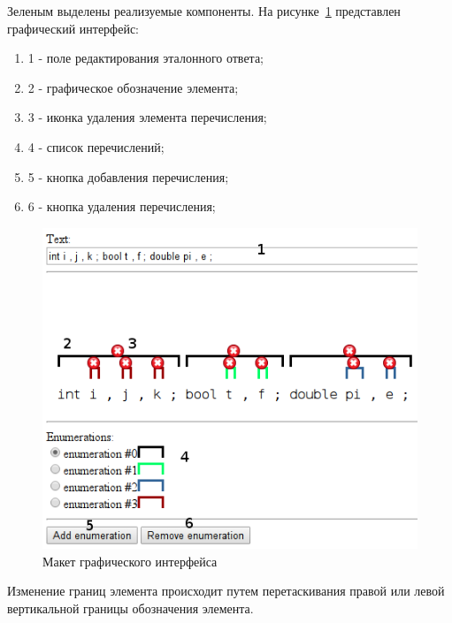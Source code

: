 \documentclass[a4paper,english]{G2-105}
\begin{document}
\par Зеленым выделены реализуемые компоненты.
На рисунке~\ref{gui} представлен графический интерфейс:
\begin{enumerate}
    \item 1 - поле редактирования эталонного ответа; 
    \item 2 - графическое обозначение элемента;
    \item 3 - иконка удаления элемента перечисления;
    \item 4 - список перечислений;
    \item 5 - кнопка добавления перечисления;
    \item 6 - кнопка удаления перечисления;
\end{enumerate}
\begin{figure} 
\includegraphics[width = \linewidth]{gui.png}
\caption{Макет графического интерфейса}\label{gui}
\end{figure}
\par Изменение границ элемента происходит путем перетаскивания правой или левой вертикальной границы обозначения элемента.
\end{document}
